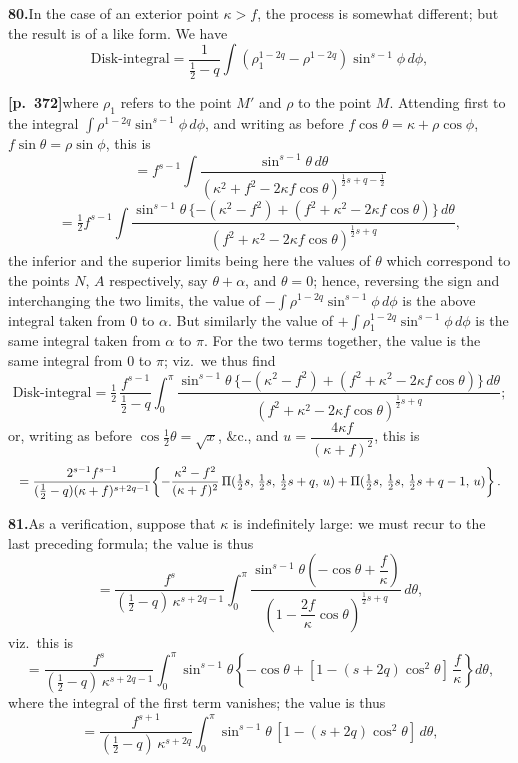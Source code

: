 \documentclass[11pt]{article}
\begin{document}
\bigskip

\noindent\textbf{80.}\quad In the case of an exterior point $\kappa>f$, the process is somewhat different; but the result is of a like form. We have
\[
\text{Disk-integral} = \frac{1}{\tfrac{1}{2}-q}\int(\rho_{1}^{1-2q}-\rho^{1-2q})\sin^{s-1}\phi\,d\phi,
\]

\bigskip

\noindent\textbf{[p.~372]}\quad where $\rho_{1}$ refers to the point $M'$ and $\rho$ to the point $M$. Attending first to the integral $\displaystyle\int \rho^{1-2q}\sin^{s-1}\phi\,d\phi$, and writing as before $f\cos\theta=\kappa+\rho\cos\phi$, $f\sin\theta=\rho\sin\phi$, this is
\[
= f^{s-1}\int\!\frac{\sin^{s-1}\theta\,d\theta}{(\kappa^{2}+f^{2}-2\kappa f\cos\theta)^{\frac{1}{2}s+q-\frac{1}{2}}}
\]
\[
= \tfrac{1}{2}f^{s-1}\int\!\frac{\sin^{s-1}\theta\,\{-(\kappa^{2}-f^{2})+(f^{2}+\kappa^{2}-2\kappa f\cos\theta)\}\,d\theta}{(f^{2}+\kappa^{2}-2\kappa f\cos\theta)^{\frac{1}{2}s+q}},
\]
the inferior and the superior limits being here the values of $\theta$ which correspond to the points $N$, $A$ respectively, say $\theta+\alpha$, and $\theta=0$; hence, reversing the sign and interchanging the two limits, the value of $-\!\displaystyle\int\rho^{1-2q}\sin^{s-1}\phi\,d\phi$ is the above integral taken from $0$ to $\alpha$. But similarly the value of $+\!\displaystyle\int\rho_{1}^{1-2q}\sin^{s-1}\phi\,d\phi$ is the same integral taken from $\alpha$ to $\pi$. For the two terms together, the value is the same integral from $0$ to $\pi$; viz.\ we thus find
\[
\text{Disk-integral} = \tfrac{1}{2}\,\frac{f^{s-1}}{\tfrac{1}{2}-q}\int_{0}^{\pi}\!\frac{\sin^{s-1}\theta\,\{-(\kappa^{2}-f^{2})+(f^{2}+\kappa^{2}-2\kappa f\cos\theta)\}\,d\theta}{(f^{2}+\kappa^{2}-2\kappa f\cos\theta)^{\frac{1}{2}s+q}};
\]
or, writing as before $\cos\tfrac{1}{2}\theta=\sqrt{x}$, \&c., and $u=\dfrac{4\kappa f}{(\kappa+f)^{2}}$, this is
\[
\resizebox{\textwidth}{!}{$\displaystyle
= \frac{2^{s-1}f^{s-1}}{(\tfrac{1}{2}-q)(\kappa+f)^{s+2q-1}}\!\left\{-\frac{\kappa^{2}-f^{2}}{(\kappa+f)^{2}}\,\Pi(\tfrac{1}{2}s,\,\tfrac{1}{2}s,\,\tfrac{1}{2}s+q,\,u) + \Pi(\tfrac{1}{2}s,\,\tfrac{1}{2}s,\,\tfrac{1}{2}s+q-1,\,u)\right\}.$}
\]

\bigskip

\noindent\textbf{81.}\quad As a verification, suppose that $\kappa$ is indefinitely large: we must recur to the last preceding formula; the value is thus
\[
= \frac{f^{s}}{(\tfrac{1}{2}-q)\,\kappa^{s+2q-1}}\int_{0}^{\pi}\!\frac{\sin^{s-1}\theta\left(-\cos\theta+\dfrac{f}{\kappa}\right)}{\left(1-\dfrac{2f}{\kappa}\cos\theta\right)^{\frac{1}{2}s+q}}\,d\theta,
\]
viz.\ this is
\[
= \frac{f^{s}}{(\tfrac{1}{2}-q)\,\kappa^{s+2q-1}}\int_{0}^{\pi}\sin^{s-1}\theta\left\{-\cos\theta+[1-(s+2q)\cos^{2}\theta]\,\frac{f}{\kappa}\right\}d\theta,
\]
where the integral of the first term vanishes; the value is thus
\[
= \frac{f^{s+1}}{(\tfrac{1}{2}-q)\,\kappa^{s+2q}}\int_{0}^{\pi}\sin^{s-1}\theta\,[1-(s+2q)\cos^{2}\theta]\,d\theta,
\]
\end{document}
